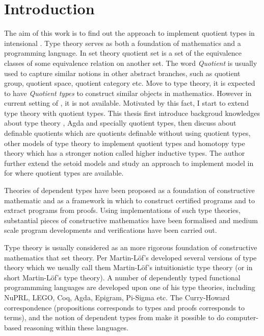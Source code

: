 \chapter{Introduction}

The aim of this work is to find out the approach to implement quotient
types in intensional \mltt. Type theory serves as both a foundation of
mathematics and a programming language. In set theory quotient set is
a set of the equivalence classes of some equivalence relation on
another set. The word \emph{Quotient} is usually used to capture
similar notions in other abstract branches, such as quotient group,
quotient space, quotient category etc. Move to type theory, it is
expected to have \emph{Quotient types} to construct similar objects in
mathematics. However in current setting of \itt, it is not
available. Motivated by this fact, I start to extend type theory with
quotient types. This thesis first
introduce backgroud knowledges about type theory , Agda and specially
quotient types, then discuss about definable quotients which are
quotients definable without using quotient types, other models of type
theory to implement quotient types and homotopy type theory which has
a stronger notion called higher inductive types. The author further
extend the setoid models and study an approach to implement \wog model
in \itt for \hott where quotient types are available.






Theories of dependent types have been proposed as a foundation of constructive mathematic and as a framework in which to construct certified programs and to extract programs from proofs. Using implementations of such type theories, substantial pieces of constructive mathematics have been formalised and medium scale program developments and verifications have been carried out.

Type theory is usually considered as an more rigorous foundation of
constructive mathematics that set theory. Per Martin-L\"{o}f's developed several
versions of type theory which we usually call them Martin-Löf's
intuitionistic type theory (or in short Martin-Löf's type theory). A number of
dependently typed functional programmming languages are developed upon
one of his type theories, including NuPRL, LEGO, Coq, Agda, Epigram, Pi-Sigma etc.
The Curry-Howard correspondence (propositions corresponds to types and
proofs corresponds to terms), and the notion of dependent types from
\mltt make it possible to do computer-based reasoning within these
languages.

